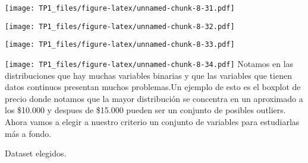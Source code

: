\documentclass[
]{article}
\newenvironment{Shaded}{\begin{snugshade}}{\end{snugshade}}
\newcommand{\DataTypeTok}[1]{\textcolor[rgb]{0.13,0.29,0.53}{#1}}
\newcommand{\KeywordTok}[1]{\textcolor[rgb]{0.13,0.29,0.53}{\textbf{#1}}}
\newcommand{\NormalTok}[1]{#1}
\newcommand{\OperatorTok}[1]{\textcolor[rgb]{0.81,0.36,0.00}{\textbf{#1}}}
\newcommand{\StringTok}[1]{\textcolor[rgb]{0.31,0.60,0.02}{#1}}
\begin{document}
\begin{Shaded}
\end{Shaded}

\texttt{[image: TP1\_files/figure-latex/unnamed-chunk-8-31.pdf]}

\begin{Shaded}
\end{Shaded}

\texttt{[image: TP1\_files/figure-latex/unnamed-chunk-8-32.pdf]}

\begin{Shaded}
\end{Shaded}

\texttt{[image: TP1\_files/figure-latex/unnamed-chunk-8-33.pdf]}

\begin{Shaded}
\end{Shaded}

\texttt{[image: TP1\_files/figure-latex/unnamed-chunk-8-34.pdf]} Notamos
en las distribuciones que hay muchas variables binarias y que las
variables que tienen datos continuos presentan muchos problemas.Un
ejemplo de esto es el boxplot de precio donde notamos que la mayor
distribución se concentra en un aproximado a los \$10.000 y despues de
\$15.000 pueden ser un conjunto de posibles outliers. Ahora vamos a
elegir a nuestro criterio un conjunto de variables para estudiarlas más
a fondo.

Dataset elegidos.
\end{document}
